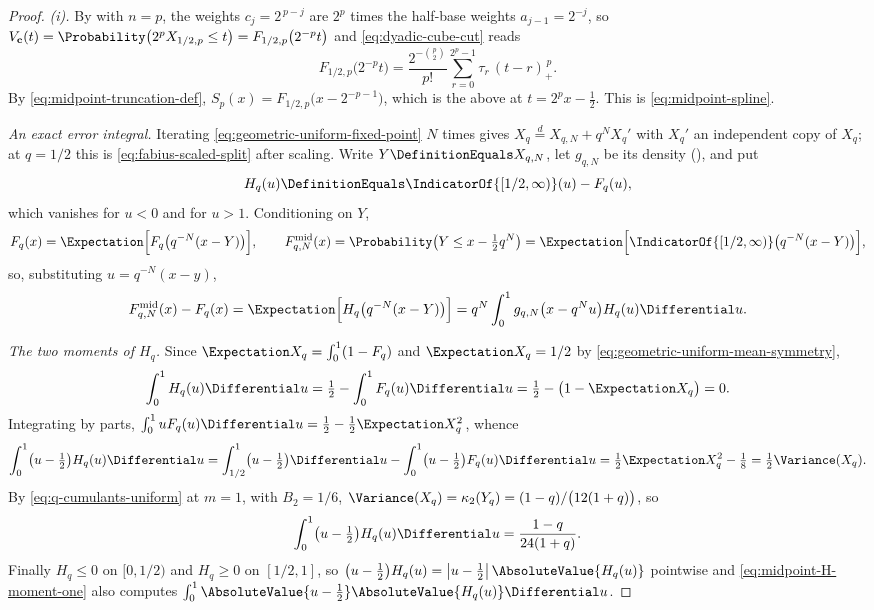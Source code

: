 \documentclass[11pt,a4paper,oneside,openany]{book}
\theoremstyle{definition}
\theoremstyle{remark}
\begin{document}
\begin{proof}
\emph{(i).}  By  with $n=p$, the weights $c_j=2^{\,p-j}$
are $2^p$ times the half-base weights $a_{j-1}=2^{-j}$, so
$V_{\mathbf c}(t)=\Probability\bigl(2^pX_{1/2,p}\le t\bigr)=F_{1/2,p}\bigl(2^{-p}t\bigr)$
and \eqref{eq:dyadic-cube-cut} reads
\[
 F_{1/2,p}\bigl(2^{-p}t\bigr)
 =\frac{2^{-\binom p2}}{p!}\sum_{r=0}^{2^p-1}\tau_r\,(t-r)_+^{\,p}.
\]
By \eqref{eq:midpoint-truncation-def}, $S_p(x)=F_{1/2,p}\bigl(x-2^{-p-1}\bigr)$,
which is the above at $t=2^px-\tfrac12$.  This is \eqref{eq:midpoint-spline}.

\emph{An exact error integral.}  Iterating \eqref{eq:geometric-uniform-fixed-point}
$N$ times gives $X_q\overset d=X_{q,N}+q^NX_q'$ with $X_q'$ an independent copy of
$X_q$; at $q=1/2$ this is \eqref{eq:fabius-scaled-split} after scaling.  Write
$Y\DefinitionEquals X_{q,N}$, let $g_{q,N}$ be its density
(), and put
\[
 H_q(u)\DefinitionEquals\IndicatorOf{[1/2,\infty)}(u)-F_q(u),
\]
which vanishes for $u<0$ and for $u>1$.  Conditioning on $Y$,
\[
 F_q(x)=\Expectation\Bigl[F_q\bigl(q^{-N}(x-Y)\bigr)\Bigr],
 \qquad
 F^{\mathrm{mid}}_{q,N}(x)
 =\Probability\bigl(Y\le x-\tfrac12q^N\bigr)
 =\Expectation\Bigl[\IndicatorOf{[1/2,\infty)}\bigl(q^{-N}(x-Y)\bigr)\Bigr],
\]
so, substituting $u=q^{-N}(x-y)$,
\begin{equation}\label{eq:midpoint-error-integral}
 F^{\mathrm{mid}}_{q,N}(x)-F_q(x)
 =\Expectation\Bigl[H_q\bigl(q^{-N}(x-Y)\bigr)\Bigr]
 =q^N\int_0^1g_{q,N}\bigl(x-q^Nu\bigr)H_q(u)\Differential u .
\end{equation}

\emph{The two moments of $H_q$.}  Since $\Expectation X_q=\int_0^1(1-F_q)$ and
$\Expectation X_q=1/2$ by \eqref{eq:geometric-uniform-mean-symmetry},
\begin{equation}\label{eq:midpoint-H-moment-zero}
 \int_0^1H_q(u)\Differential u=\tfrac12-\int_0^1F_q(u)\Differential u
 =\tfrac12-\bigl(1-\Expectation X_q\bigr)=0 .
\end{equation}
Integrating by parts, $\int_0^1uF_q(u)\Differential u=\tfrac12-\tfrac12\Expectation X_q^2$, whence
\[
 \int_0^1\bigl(u-\tfrac12\bigr)H_q(u)\Differential u
 =\int_{1/2}^1\bigl(u-\tfrac12\bigr)\Differential u-\int_0^1\bigl(u-\tfrac12\bigr)F_q(u)\Differential u
 =\tfrac12\Expectation X_q^2-\tfrac18
 =\tfrac12\Variance(X_q).
\]
By \eqref{eq:q-cumulants-uniform} at $m=1$, with $B_2=1/6$,
$\Variance(X_q)=\kappa_2(Y_q)=(1-q)/\bigl(12(1+q)\bigr)$, so
\begin{equation}\label{eq:midpoint-H-moment-one}
 \int_0^1\bigl(u-\tfrac12\bigr)H_q(u)\Differential u=\frac{1-q}{24(1+q)} .
\end{equation}
Finally $H_q\le0$ on $[0,1/2)$ and $H_q\ge0$ on $[1/2,1]$, so
$\bigl(u-\tfrac12\bigr)H_q(u)=\bigl|u-\tfrac12\bigr|\,\AbsoluteValue{H_q(u)}$ pointwise and
\eqref{eq:midpoint-H-moment-one} also computes
$\int_0^1\AbsoluteValue{u-\tfrac12}\AbsoluteValue{H_q(u)}\Differential u$.


\end{proof}
\end{document}
